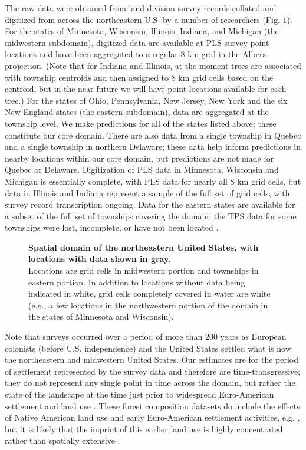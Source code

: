 \documentclass[10pt,letterpaper]{article}
\begin{document}
The raw data were obtained from land division survey records collated
and digitized from across the northeastern U.S. by a number of researchers
(Fig. \ref{fig:Spatial-domain}). For the states of Minnesota, Wisconsin,
Illinois, Indiana, and Michigan (the midwestern subdomain), digitized
data are available at PLS survey point locations and have been aggregated
to a regular 8 km grid in the Albers projection. (Note that for Indiana
and Illinois, at the moment trees are associated with township centroids
and then assigned to 8 km grid cells based on the centroid, but in
the near future we will have point locations available for each tree.)
For the states of Ohio, Pennsylvania, New Jersey, New York and the
six New England states (the eastern subdomain), data are aggregated
at the township level. We make predictions for all
of the states listed above; these constitute our core domain. There
are also data from a single township in Quebec and a single township
in northern Delaware; these data help inform predictions
in nearby locations within our core domain, but predictions are not
made for Quebec or Delaware. Digitization of PLS data in Minnesota,
Wisconsin and Michigan is essentially complete, with PLS data for
nearly all 8 km grid cells, but data in Illinois and Indiana represent
a sample of the full set of grid cells, with survey record transcription
ongoing. Data for the eastern states are available for a subset of
the full set of townships covering the domain; the TPS data for some
townships were lost, incomplete, or have not been located \cite{Cogb:etal:2002}. 

\begin{figure}

\caption{{\bf Spatial domain of the northeastern United States, with locations with
data shown in gray.} \\ Locations are grid cells in midwestern portion
and townships in eastern portion. In addition to locations without
data being indicated in white, grid cells completely covered in water
are white (e.g., a few locations in the northwestern portion of the
domain in the states of Minnesota and Wisconsin).}
\label{fig:Spatial-domain}
\end{figure}

Note that surveys occurred over a period of more than 200 years as
European colonists (before U.S. independence) and the United States
settled what is now the northeastern and midwestern United States.
Our estimates are for the period of settlement represented by the
survey data and therefore are time-transgressive; they do not represent
any single point in time across the domain, but rather the state of
the landscape at the time just prior to widespread Euro-American settlement
and land use \cite{Whit:1996,Cogb:etal:2002}. These forest composition
datasets do include the effects of Native American land use and early
Euro-American settlement activities, e.g. \cite{Blac:etal:2006},
but it is likely that the imprint of this earlier land use is highly
concentrated rather than spatially extensive \cite{munoz2014defining}.
\end{document}
